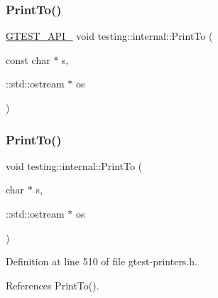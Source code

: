 \mbox{\label{namespacetesting_1_1internal_ac226053b96d7d61f9407e3b75bab07d9}} 
\subsubsection{\texorpdfstring{Print\+To()}{PrintTo()}\hspace{0.1cm}{\footnotesize\ttfamily [10/20]}}
{\footnotesize\ttfamily \hyperlink{gtest-port_8h_aa73be6f0ba4a7456180a94904ce17790}{G\+T\+E\+S\+T\+\_\+\+A\+P\+I\+\_\+} void testing\+::internal\+::\+Print\+To (\begin{DoxyParamCaption}\item[{const char $\ast$}]{s,  }\item[{\+::std\+::ostream $\ast$}]{os }\end{DoxyParamCaption})}

\mbox{\label{namespacetesting_1_1internal_a553eec7bb50de01c9e91cac4accc606f}} 
\subsubsection{\texorpdfstring{Print\+To()}{PrintTo()}\hspace{0.1cm}{\footnotesize\ttfamily [11/20]}}
{\footnotesize\ttfamily void testing\+::internal\+::\+Print\+To (\begin{DoxyParamCaption}\item[{char $\ast$}]{s,  }\item[{\+::std\+::ostream $\ast$}]{os }\end{DoxyParamCaption})\hspace{0.3cm}{\ttfamily [inline]}}



Definition at line 510 of file gtest-\/printers.\+h.



References Print\+To().


